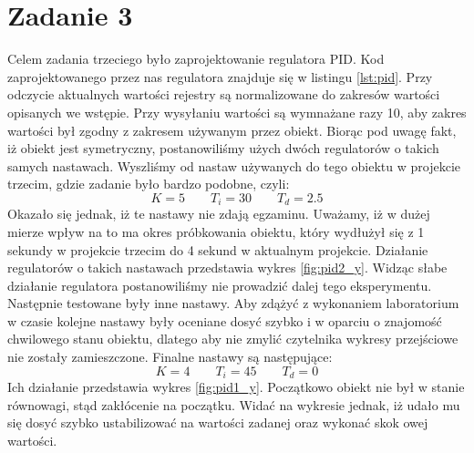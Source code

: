 \chapter{Zadanie 3}
Celem zadania trzeciego było zaprojektowanie regulatora PID. Kod zaprojektowanego
przez nas regulatora znajduje się w listingu \ref{lst:pid}. Przy odczycie aktualnych
wartości rejestry są normalizowane do zakresów wartości opisanych we wstępie.
Przy wysyłaniu wartości są wymnażane razy 10, aby zakres wartości był zgodny
z zakresem używanym przez obiekt.
Biorąc pod uwagę fakt, iż obiekt jest symetryczny, postanowiliśmy użych dwóch regulatorów
o takich samych nastawach. Wyszliśmy od nastaw używanych do tego obiektu w
projekcie trzecim, gdzie zadanie było bardzo podobne, czyli:
\begin{equation}
  K = \num{5} \qquad T_i = \num{30} \qquad T_d = \num{2.5}
\end{equation}
Okazało się jednak, iż te nastawy nie zdają egzaminu. Uważamy, iż w dużej
mierze wpływ na to ma okres próbkowania obiektu, który wydłużył się z 1 sekundy
w projekcie trzecim do 4 sekund w aktualnym projekcie. Działanie regulatorów
o takich nastawach przedstawia wykres \ref{fig:pid2_y}. Widząc słabe działanie
regulatora postanowiliśmy nie prowadzić dalej tego eksperymentu. Następnie
testowane były inne nastawy. Aby zdążyć z wykonaniem laboratorium w czasie
kolejne nastawy były oceniane dosyć szybko i w oparciu o znajomość chwilowego
stanu obiektu, dlatego aby nie zmylić czytelnika wykresy przejściowe nie zostały
zamieszczone. Finalne nastawy są następujące:
\begin{equation}
  K = \num{4} \qquad T_i = \num{45} \qquad T_d = \num{0}
\end{equation}
Ich działanie przedstawia wykres \ref{fig:pid1_y}. Początkowo obiekt nie był
w stanie równowagi, stąd zakłócenie na początku. Widać na wykresie jednak, iż
udało mu się dosyć szybko ustabilizować na wartości zadanej oraz wykonać skok
owej wartości.

